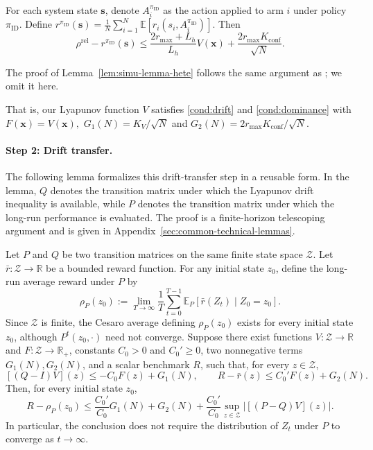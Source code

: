 \documentclass[mnsc,nonblindrev]{informs3}
\newcommand{\E}{\mathbb{E}}
\newcommand{\piid}{\pi_{\mathrm{ID}}}
\newcommand{\bms}{\bm{s}}
\newcommand{\bmx}{\bm{x}}
\newcommand{\rhorel}{\rho^{\mathrm{rel}}}
\begin{document}
\begin{lemma}\label{lem:simu-lemma-hete}
    For each system state $\bms$, denote $A_i^{\piid}$ as the action applied to arm $i$ under policy $\piid$. Define
    $
    r^{\piid}(\bms)=\frac{1}{N}\sum_{i=1}^N\E[r_i(s_i,A_i^{\piid})].
    $
    Then
    \[
    \rhorel-r^{\piid}(\bms)\le \frac{2r_{\max}+L_h}{L_h}V(\bmx)+\frac{2r_{\max}K_{\mathrm{conf}}}{\sqrt{N}}.
    \]
\end{lemma}
The proof of Lemma~\ref{lem:simu-lemma-hete} follows the same argument as \citet[Lemma~4]{zhang2025projection}; we omit it here.



That is, our Lyapunov function $V$ satisfies \ref{cond:drift} and \ref{cond:dominance} with $F(\bmx)=V(\bmx),$ $G_1(N)=K_V/\sqrt{N}$ and $G_2(N)={2r_{\max}K_{\mathrm{conf}}}/{\sqrt{N}}$.%

\paragraph{Step 2: Drift transfer.} 
The following lemma formalizes this drift-transfer step in a reusable
form. In the lemma, \(Q\) denotes the transition matrix under which the
Lyapunov drift inequality is available, while \(P\) denotes the transition
matrix under which the long-run performance is evaluated. The proof is a
finite-horizon telescoping argument and is given in
Appendix~\ref{sec:common-technical-lemmas}.
\begin{lemma}
\label{lem:generic-drift-transfer}
Let \(P\) and \(Q\) be two transition matrices on the same finite state
space \(\mathcal Z\). Let \(\bar r:\mathcal Z\to\mathbb R\) be a bounded reward function. For any initial state \(z_0\), define the
long-run average reward under \(P\) by
\[
    \rho_P(z_0)
    :=
    \lim_{T\to\infty}
    \frac1T
    \sum_{t=0}^{T-1}
    \mathbb E_P[\bar r(Z_t)\mid Z_0=z_0].
\]
Since \(\mathcal Z\) is finite, the Cesaro average defining
\(\rho_P(z_0)\) exists for every initial state \(z_0\), although
\(P^t(z_0,\cdot)\) need not converge. Suppose there exist functions
\(V:\mathcal Z\to\mathbb R\) and \(F:\mathcal Z\to\mathbb R_+\),
constants \(C_0>0\) and \(C_0'\ge0\), two nonnegative terms
\(G_1(N),G_2(N)\), and a scalar benchmark \(R\), such that, for every
\(z\in\mathcal Z\),
\[
    [(Q-I)V](z)
    \le
    -C_0F(z)+G_1(N),
    \qquad
    R-\bar r(z)
    \le
    C_0'F(z)+G_2(N).
\]
Then, for every initial state \(z_0\),
\[
    R-\rho_P(z_0)
    \le
    \frac{C_0'}{C_0}G_1(N)
    +
    G_2(N)
    +
    \frac{C_0'}{C_0}
    \sup_{z\in\mathcal Z}
    \left|[(P-Q)V](z)\right|.
\]
In particular, the conclusion does not require the distribution of \(Z_t\)
under \(P\) to converge as \(t\to\infty\).
\end{lemma}
\end{document}
